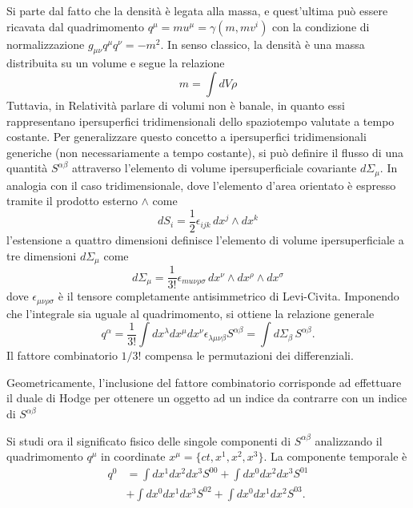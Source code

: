 Si parte dal fatto che la densità è legata alla massa, e quest'ultima può essere ricavata dal quadrimomento $q^\mu = m u^\mu = \gamma (m, mv^i)$ con la condizione di normalizzazione $g_{\mu\nu}q^\mu q^\nu = -m^2$. In senso classico, la densità è una massa distribuita su un volume e segue la relazione
\begin{equation}
    m = \int dV \rho
\end{equation}
Tuttavia, in Relatività parlare di volumi non è banale, in quanto essi rappresentano ipersuperfici tridimensionali dello spaziotempo valutate a tempo costante. Per generalizzare questo concetto a ipersuperfici tridimensionali generiche (non necessariamente a tempo costante), si può definire il flusso di una quantità $S^{\alpha\beta}$ attraverso l'elemento di volume ipersuperficiale covariante $d\Sigma_\mu$. In analogia con il caso tridimensionale, dove l'elemento d'area orientato è espresso tramite il prodotto esterno $\wedge$ come
\begin{equation}
    dS_i = \frac{1}{2} \epsilon_{ijk}\,dx^j \wedge dx^k
\end{equation}
l'estensione a quattro dimensioni definisce l'elemento di volume ipersuperficiale a tre dimensioni $d\Sigma_\mu$ come
\begin{equation}
    d\Sigma_\mu = \frac{1}{3!} \epsilon_{mu\nu\rho\sigma}\,dx^\nu \wedge dx^\rho \wedge dx^\sigma
\end{equation}
dove $\epsilon_{\mu\nu\rho\sigma}$ è il tensore completamente antisimmetrico di Levi-Civita. Imponendo che l'integrale sia uguale al quadrimomento, si ottiene la relazione generale
\begin{equation}
\label{eq: quadrimomento in forma integrale}
    q^\alpha = \frac{1}{3!} \int dx^\lambda dx^\mu dx^\nu \epsilon_{\lambda\mu\nu\beta} S^{\alpha\beta} = \int d\Sigma_\beta\,S^{\alpha\beta}. 
\end{equation}
Il fattore combinatorio $1/3!$ compensa le permutazioni dei differenziali.
\begin{obs}
    Geometricamente, l'inclusione del fattore combinatorio corrisponde ad effettuare il duale di Hodge per ottenere un oggetto ad un indice da contrarre con un indice di $S^{\alpha\beta}$
\end{obs}
Si studi ora il significato fisico delle singole componenti di $S^{\alpha\beta}$ analizzando il quadrimomento $q^\mu$ in coordinate $x^\mu = \{ct, x^1, x^2, x^3\}$. La componente temporale è
\begin{equation}
    \begin{split}
        q^0 &= \int dx^1 dx^2 dx^3 S^{00} + \int dx^0 dx^2 dx^3 S^{01} \\
        &+ \int dx^0 dx^1 dx^3 S^{02} + \int dx^0 dx^1 dx^2 S^{03}.
    \end{split}
\end{equation}
